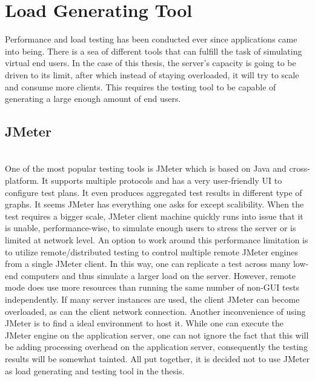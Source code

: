 \chapter{Load Generating Tool}
Performance and load testing has been conducted ever since applications came into being. There is a sea of different tools that can fulfill the task of simulating virtual end users. In the case of this thesis, the server's capacity is going to be driven to its limit, after which instead of staying overloaded, it will try to scale and consume more clients. This requires the testing tool to be capable of generating a large enough amount of end users. 

\section{JMeter}
\\One of the most popular testing tools is JMeter which is based on Java and cross-platform. It supports multiple protocols and has a very user-friendly UI to configure test plans. It even produces aggregated test results in different type of graphs. It seems JMeter has everything one asks for except scalibility. When the test requires a bigger scale, JMeter client machine quickly runs into issue that it is unable, performance-wise, to simulate enough users to stress the server or is limited at network level. An option to work around this performance limitation is to utilize remote/distributed testing \citep{JMeterRemote} to control multiple remote JMeter engines from a single JMeter client. In this way, one can replicate a test across many low-end computers and thus simulate a larger load on the server. However, remote mode does use more resources than running the same number of non-GUI tests independently. If many server instances are used, the client JMeter can become overloaded, as can the client network connection. Another inconvenience of using JMeter is to find a ideal environment to host it. While one can execute the JMeter engine on the application server, one can not ignore the fact that this will be adding processing overhead on the application server, consequently  the testing results will be somewhat tainted. All put together, it is decided not to use JMeter as load generating and testing tool in the thesis. \\

